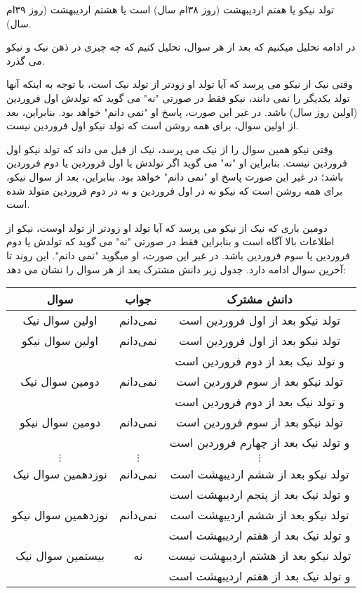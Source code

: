 \begin{solution}
تولد نیکو  یا هفتم اردیبهشت (روز ۳۸ام سال) است یا هشتم اردیبهشت (روز ۳۹ام سال).

در ادامه تحلیل میکنیم که بعد از هر سوال، تحلیل کنیم که چه چیزی در ذهن نیک و نیکو می گذرد.

وقتی نیک از نیکو می پرسد که آیا تولد او زودتر از تولد نیک است، با توجه به اینکه آنها تولد یکدیگر را نمی دانند، نیکو فقط در صورتی "نه" می گوید که تولدش اول فروردین (اولین روز سال) باشد. در غیر این صورت، پاسخ او "نمی دانم" خواهد بود. بنابراین، بعد از اولین سوال، برای همه روشن است که تولد نیکو اول فروردین نیست.

وقتی نیکو همین سوال را از نیک می پرسد، نیک از قبل می داند که تولد نیکو اول فروردین نیست. بنابراین او "نه" می گوید اگر تولدش یا اول فروردین یا دوم فروردین باشد؛ در غیر این صورت پاسخ او "نمی دانم" خواهد بود. بنابراین، بعد از سوال نیکو، برای همه روشن است که نیکو نه در اول فروردین و نه در دوم فروردین متولد شده است.

دومین باری که نیک از نیکو می پرسد که آیا تولد او زودتر از تولد اوست، نیکو از اطلاعات بالا آگاه است و بنابراین فقط در صورتی "نه" می گوید  که تولدش یا دوم فروردین یا سوم فروردین باشد. در غیر این صورت، او میگوید "نمی دانم". این روند تا آخرین سوال ادامه دارد. جدول زیر دانش مشترک بعد از هر سوال را نشان می دهد:

\begin{center}
	\begin{tabular}{|c|c|c|}
		\hline
		سوال & جواب & دانش مشترک \\
		\hline
		اولین سوال نیک & نمی‌دانم & تولد نیکو بعد از اول فروردین است \\
		\hline 
		اولین سوال نیکو & نمی‌دانم & تولد نیکو بعد از اول فروردین است \\
		& & و تولد نیک بعد از دوم فروردین است \\
		\hline
		دومین سوال نیک & نمی‌دانم & تولد نیکو بعد از سوم فروردین است \\
		& & و تولد نیک بعد از دوم فروردین است \\
		\hline
		دومین سوال نیکو & نمی‌دانم & تولد نیکو بعد از سوم فروردین است \\
		& & و تولد نیک بعد از چهارم فروردین است \\
		\hline
		$\vdots$ & $\vdots$ & $\vdots$ \\
		\hline
		نوزدهمین سوال نیک & نمی‌دانم & تولد نیکو بعد از ششم اردیبهشت است \\
		& & و تولد نیک بعد از پنجم اردیبهشت است \\
		\hline
		نوزدهمین سوال نیکو & نمی‌دانم & تولد نیکو بعد از ششم اردیبهشت است \\
		& & و تولد نیک بعد از هفتم اردیبهشت است \\
		\hline
		بیستمین سوال نیک & نه & تولد نیکو بعد از هشتم اردیبهشت نیست \\
		& & و تولد نیک بعد از هفتم اردیبهشت است \\
		\hline
	\end{tabular}
\end{center}

\end{solution}

